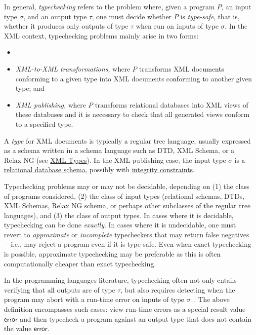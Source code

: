 \documentclass[twoside,leqno,onecolumn,pdftex]{article}
\newcommand{\error}{\textsf{error}\xspace}
\begin{document}
\begin{definition}

  In general, \emph{typechecking} refers to the problem where, given a
  program $P$, an input type $\sigma$, and an output type $\tau$, one
  must decide whether $P$ is \emph{type-safe}, that is, whether it
  produces only outputs of type $\tau$ when run on inputs of type
  $\sigma$.  In the XML context, typechecking problems mainly arise in
  two forms:
  \begin{itemize}
  \item 
  \item \emph{XML-to-XML transformations,} where $P$ transforms
    XML documents conforming to a given type  into XML documents
    conforming to another given type; and
  \item \emph{XML publishing,} where $P$ transforms relational
    databases into XML views of these databases and it is necessary to
    check that all generated views conform to a specified type.
  \end{itemize}
  A \emph{type} for XML documents is typically a regular tree
  language, usually expressed as a schema written in a schema language
  such as DTD, XML Schema, or a Relax NG (see \underline{XML Types}).
  In the XML publishing case, the input type $\sigma$ is a
  \underline{relational database schema}, possibly with
  \underline{integrity constraints}.  

  Typechecking problems may or may not be decidable, depending on (1) the
  class of programs considered, (2) the class of input types (relational
  schemas, DTDs, XML Schemas, Relax NG schema, or perhaps other subclasses
  of the regular tree languages), and (3) the class of output types.  In
  cases where it is decidable, typechecking can be done \emph{exactly}. In
  cases where it is undecidable, one must revert to \emph{approximate} or
  \emph{incomplete} typecheckers that may return false negatives---i.e., may
  reject a program even if it is type-safe. Even when exact typechecking is
  possible, approximate typechecking may be preferable as this is often
  computationally cheaper than exact typechecking.
  
  In the programming languages literature, typechecking often not only
  entails verifying that all outputs are of type $\tau$, but also
  requires detecting when the program may abort with a run-time error
  on inputs of type $\sigma$~\cite{pierce:types-proglang}.  The above
  definition encompasses such cases: view run-time errors as a special
  result value $\error$ and then typecheck a program against an output
  type that does not contain the value $\error$.
\end{definition}
~\\\\
\end{document}
